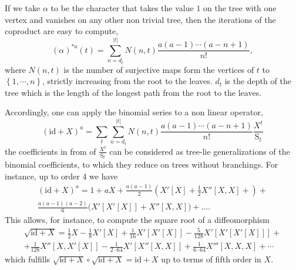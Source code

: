 \documentclass[12pt,here,feynmf]{article}
\begin{document}
If we take $\alpha$ to be the character that takes the value $1$ on the tree with one vertex and vanishes on any other non trivial tree, then the iterations of the coproduct are easy to compute,
\begin{equation}
(\alpha)^{\ast a}(t)=\sum_{n=d_{t}}^{|t|}N(n,t)\frac{a(a-1)\cdots (a-n+1)}{n!},
\end{equation}
where $N(n,t)$ is the number of surjective maps form the vertices of $t$ to $\left\{1,\cdots,n\right\}$, strictly increasing from the root to the leaves. $d_{t}$ is the depth of the tree which is the length of the longest path from the root to the leaves. 

Accordingly, one can apply the binomial series to a non linear operator,
\begin{equation}
(\mathrm{id}+X)^{a}=\sum_{t}
\sum_{n=d_{t}}^{|t|}N(n,t)\frac{a(a-1)\cdots (a-n+1)}{n!}
\frac{X^{t}}{\mathrm{S}_{t}}\label{binomX}
\end{equation}
the coefficients in from of $\frac{X^{t}}{\mathrm{S}_{t}}$ can be considered as tree-lie generalizations of the binomial coefficients, to which they reduce on trees without branchings.
For instance, up to order 4 we have
\begin{multline}
(\mathrm{id}+X)^{a}=1+aX+\frac{a(a-1)}{2}\left(X'[X]+\frac{1}{2}X''[X,X]+\right)+\\
\frac{a(a-1)(a-2)}{6}\bigg( X'[X'[X]]+X''[X,X]\bigg)+\dots.
\end{multline}
This allows, for instance, to compute the square root of a diffeomorphism 
\begin{multline}
\sqrt{\mathrm{id}+X}=\frac{1}{2}X-\frac{1}{8}X'[X]+\frac{1}{16}X'[X'[X]]-\frac{5}{128}X'[X'[X'[X]]]+\\
+\frac{1}{128}X''[X,X'[X]]-\frac{1}{2\cdot 64}X'[X''[X,X]]+\frac{1}{6\cdot 64}X'''[X,X,X]+\cdots
\end{multline}
which fulfills $\sqrt{\mathrm{id}+X}\circ\sqrt{\mathrm{id}+X}=\mathrm{id}+X$ up to terms of fifth order in $X$. 
\end{document}
